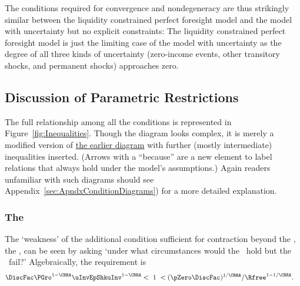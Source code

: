 \documentclass[BufferStockTheory]{subfiles}
\begin{document}
The conditions required for convergence and nondegeneracy are thus strikingly similar between the liquidity constrained perfect foresight model and the model with uncertainty but no explicit constraints: The liquidity constrained perfect foresight model is just the limiting case of the model with uncertainty as the degree of all three kinds of uncertainty (zero-income events, other transitory shocks, and permanent shocks) approaches zero.


\hypertarget{Discussion-of-Parametric-Restrictions}{}
\subsection{Discussion of Parametric Restrictions}\label{sec:discussConvergence}

The full relationship among all the conditions is represented in Figure~\ref{fig:Inequalities}.
Though the diagram looks complex, it is merely a modified version of \href{fig:RelatePFGICFHWCRICPFFVAC}{the earlier diagram} with further (mostly intermediate) inequalities inserted.  (Arrows with a ``because'' are a new element to label relations that always hold under the model's assumptions.)  Again readers unfamiliar with such diagrams should see Appendix~\ref{sec:ApndxConditionDiagrams}) for a more detailed explanation.

\renewcommand{\figName}{Inequalities} %
\renewcommand{\figFile}{\figName} %
\hypertarget{\figFile}{}
\hypertarget{\figName}{}

\subsubsection{The \WRIC}\label{subsubsec:WRICdiscuss}

The `weakness' of the additional condition sufficient for contraction beyond the {\FVAC}, the
\WRIC, can be seen by asking `under what circumstances
would the \FVAC~hold but the \WRIC~fail?'
Algebraically, the requirement is
\begin{align}
  \DiscFac \PGro^{1-\CRRA}\uInvEpShkuInv^{1-\CRRA} & < ~ 1 ~ <  (\pZero \DiscFac)^{1/\CRRA}/\Rfree^{1-1/\CRRA}. \label{eq:WRICandFVAC}
\end{align}
\end{document}
